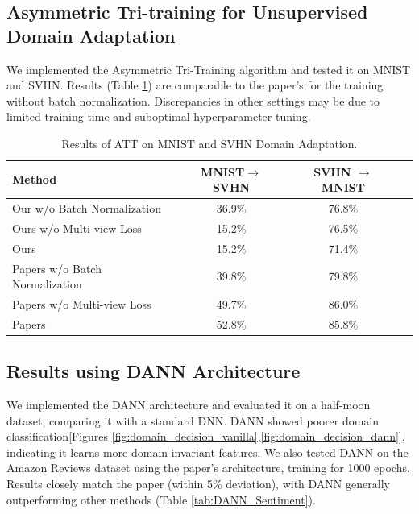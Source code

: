\documentclass{article}
\begin{document}
\subsection{Asymmetric Tri-training for Unsupervised Domain Adaptation}
We implemented the Asymmetric Tri-Training algorithm and tested it on MNIST and SVHN. Results (Table \ref{tab:att_results}) are comparable to the paper's for the training without batch normalization. Discrepancies in other settings may be due to limited training time and suboptimal hyperparameter tuning.
\begin{table}
  \centering
  \caption{Results of ATT on MNIST and SVHN Domain Adaptation.}
  \label{tab:att_results}
  \begin{tabular}{lccc}
      \toprule
      \textbf{Method} & \textbf{MNIST\(\to\)SVHN} & \textbf{SVHN \(\to\) MNIST} \\
      \midrule
      Our w/o Batch Normalization & 36.9\% & 76.8\% \\
      Ours w/o Multi-view Loss & 15.2\% & 76.5\% \\
      Ours  & 15.2\% & 71.4\% \\
      \midrule
      Papers w/o Batch Normalization & 39.8\% & 79.8\% \\
      Papers w/o Multi-view Loss & 49.7\% & 86.0\% \\
      Papers  & 52.8\% & 85.8\% \\
      \bottomrule
  \end{tabular}
\end{table}


\subsection{Results using DANN Architecture}
We implemented the DANN architecture and evaluated it on a half-moon dataset, comparing it with a standard DNN. DANN showed poorer domain classification[Figures \ref{fig:domain_decision_vanilla},\ref{fig:domain_decision_dann}], indicating it learns more domain-invariant features.
We also tested DANN on the Amazon Reviews dataset using the paper’s architecture, training for 1000 epochs. Results closely match the paper (within 5\% deviation), with DANN generally outperforming other methods (Table \ref{tab:DANN_Sentiment}).
\end{document}
